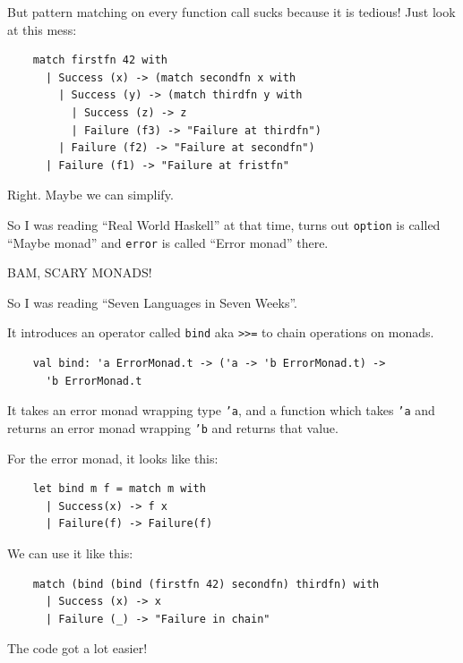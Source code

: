 \documentclass{beamer}
\begin{document}
\begin{frame}[fragile]
  But pattern matching on every function call sucks because it is
  \alert{tedious}! Just look at this mess:
  \begin{verbatim}
    match firstfn 42 with 
      | Success (x) -> (match secondfn x with
        | Success (y) -> (match thirdfn y with
          | Success (z) -> z
          | Failure (f3) -> "Failure at thirdfn")
        | Failure (f2) -> "Failure at secondfn")
      | Failure (f1) -> "Failure at fristfn"
  \end{verbatim}

  Right. Maybe we can simplify.

  So I was reading \enquote{Real World Haskell} at that time, turns out
  \texttt{option} is called \enquote{Maybe monad} and \texttt{error}
  is called \enquote{Error monad} there.

  \pause
  \begin{center}
    {\Large \alert{BAM, SCARY MONADS!}}
  \end{center}
\end{frame}

\begin{frame}[fragile]
  So I was reading \enquote{Seven Languages in Seven Weeks}.

  It introduces an operator called \texttt{bind} aka \texttt{>>=} to
  chain operations on monads.

  \begin{verbatim}
    val bind: 'a ErrorMonad.t -> ('a -> 'b ErrorMonad.t) ->
      'b ErrorMonad.t
  \end{verbatim}

  It takes an error monad wrapping type \texttt{'a}, and a function
  which takes \texttt{'a} and returns an error monad wrapping
  \texttt{'b} and returns that value.
\end{frame}

\begin{frame}[fragile]
  For the error monad, it looks like this:
  \begin{verbatim}
    let bind m f = match m with
      | Success(x) -> f x
      | Failure(f) -> Failure(f)
  \end{verbatim}

  We can use it like this:

  \begin{verbatim}
    match (bind (bind (firstfn 42) secondfn) thirdfn) with
      | Success (x) -> x
      | Failure (_) -> "Failure in chain"
  \end{verbatim}
  The code got a lot easier!
\end{frame}
\end{document}
